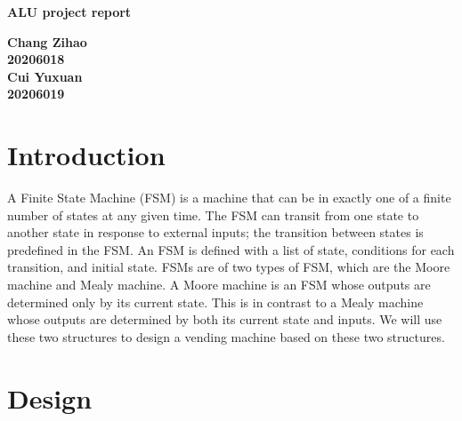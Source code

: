 \documentclass[12pt,a4paper]{article}
\begin{document}
\begin{titlepage}
  \begin{center}
    \vspace*{1cm}

    \textbf{\Huge ALU project report}

    \vspace{0.5cm}

         
    \vspace{1.5cm}

    \textbf{\large Chang Zihao \\20206018\\\large Cui Yuxuan\\20206019}

    \vfill
         

         
    \vspace{0.8cm}
  


         
\end{center}
\end{titlepage}


\newpage
\tableofcontents
\thispagestyle{empty}

\newpage
{}
\setcounter{page}{1}

\section{Introduction}

A Finite State Machine (FSM) is a machine that can be in exactly one of a finite number of states at any given time. 
The FSM can transit from one state to another state in response to external inputs; 
the transition between states is predefined in the FSM. 
An FSM is defined with a list of state, conditions for each transition, and initial state. 
FSMs are of two types of FSM, which are the Moore machine and Mealy machine. 
A Moore machine is an FSM whose outputs are determined only by its current state. 
This is in contrast to a Mealy machine whose outputs are determined by both its current state and inputs. 
We will use these two structures to design a vending machine based on these two structures.


\newpage

\section{Design}
\end{document}
